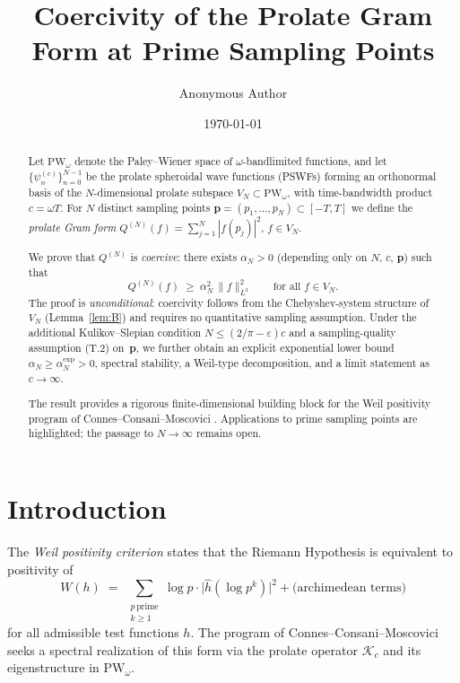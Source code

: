 \documentclass[12pt,a4paper]{amsart}
\title[Coercivity of the Prolate Gram Form]
      {Coercivity of the Prolate Gram Form at Prime Sampling Points}
\author{Anonymous Author}
\date{\today}
\theoremstyle{definition}
\newcommand{\PW}{\mathrm{PW}_\omega}
\newcommand{\Kop}{\mathcal{K}_c}
\newcommand{\AM}{\alpha_N}
\newcommand{\QM}{Q^{(N)}}
\newcommand{\psin}{\psi_n^{(c)}}
\newcommand{\norm}[1]{\|#1\|}
\begin{document}
\maketitle

\begin{abstract}
Let $\PW$ denote the Paley--Wiener space of $\omega$-bandlimited
functions, and let $\{\psin\}_{n=0}^{N-1}$ be the prolate spheroidal
wave functions (PSWFs) forming an orthonormal basis of the
$N$-dimensional prolate subspace $V_N\subset\PW$, with
time-bandwidth product $c=\omega T$.
For $N$ distinct sampling points $\mathbf{p}=(p_1,\ldots,p_N)\subset[-T,T]$
we define the \emph{prolate Gram form}
$\QM(f)=\sum_{j=1}^N|f(p_j)|^2$, $f\in V_N$.

We prove that $\QM$ is \emph{coercive}:
there exists $\AM>0$ (depending only on $N$, $c$, $\mathbf{p}$) such that
\[
  \QM(f)\;\geq\;\AM^2\,\norm{f}_{L^2}^2
  \qquad\text{for all }f\in V_N.
\]
The proof is \emph{unconditional}: coercivity follows from the
Chebyshev-system structure of $V_N$ (Lemma~\ref{lem:B}) and requires
no quantitative sampling assumption.
Under the additional Kulikov--Slepian condition
$N\leq(2/\pi-\varepsilon)c$ and a sampling-quality assumption
\textup{(T.2)} on~$\mathbf{p}$, we further obtain an explicit
exponential lower bound $\AM\geq\AM^{\mathrm{exp}}>0$, spectral
stability, a Weil-type decomposition, and a limit statement as
$c\to\infty$.

The result provides a rigorous finite-dimensional building block
for the Weil positivity program of Connes--Consani--Moscovici
\cite{CCM2025}. Applications to prime sampling points are
highlighted; the passage to $N\to\infty$ remains open.
\end{abstract}

\tableofcontents

\section{Introduction}

The \emph{Weil positivity criterion} \cite{Weil1952,Bombieri2000,CC2019}
states that the Riemann Hypothesis is equivalent to positivity of
\[
  W(h)\;=\;
  \sum_{\substack{p\,\text{prime}\\k\geq1}}
  \log p\cdot\bigl|\widehat{h}(\log p^k)\bigr|^2
  +\text{(archimedean terms)}
\]
for all admissible test functions $h$.
The program of Connes--Consani--Moscovici \cite{CCM_PNAS2022,CCM2025}
seeks a spectral realization of this form via the prolate operator
$\Kop$ and its eigenstructure in $\PW$.
\end{document}
